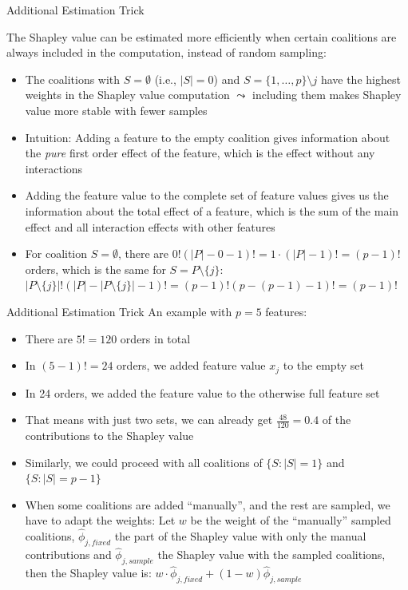 \documentclass[11pt,compress,t,notes=noshow, aspectratio=169, xcolor=table]{beamer}
\begin{document}
\begin{frame}{Additional Estimation Trick}


  The Shapley value can be estimated more efficiently when certain coalitions are always included in the computation, instead of random sampling:
  \vspace{0.25cm}
  \begin{itemize}
  \itemsep1em
    \item The coalitions with $S = \emptyset$ (i.e., $|S| = 0$) and $S = \{1, \ldots, p\} \setminus j$ have the highest weights in the Shapley value computation $\leadsto$ including them makes Shapley value more stable with fewer samples %
    \item Intuition: Adding a feature to the empty coalition gives information about the \textit{pure} first order effect of the feature, which is the effect without any interactions 
    \item Adding the feature value to the complete set of feature values gives us the information about the total effect of a feature, which is the sum of the main effect and all interaction effects with other features
    \item For coalition $S = \emptyset$, there are $0! (|P| - 0 - 1)! = 1 \cdot (|P| - 1)! = (p - 1)!$ orders, which is the same for $S = P \setminus \{j\}$: $|P \setminus \{j\}|! (|P| - |P \setminus \{j\}| - 1)! = (p - 1)! (p - (p-1) - 1)! = (p-1)!$
\end{itemize}
 \end{frame}

\begin{frame}{Additional Estimation Trick}
An example with $p = 5$ features:
\vspace{0.25cm}
    \begin{itemize}
    \itemsep1em
        \item There are $5! = 120$ orders in total
        \item In $(5 - 1)! = 24$ orders, we added feature value $x_j$ to the empty set
        \item In 24 orders, we added the feature value to the otherwise full feature set
        \item That means with just two sets, we can already get $\frac{48}{120} = 0.4$ of the contributions to the Shapley value
        \item Similarly, we could proceed with all coalitions of $\{S: |S| = 1\}$ and $\{S: |S| = p - 1\}$
        \item When some coalitions are added \enquote{manually}, and the rest are sampled, we have to adapt the weights: Let $w$ be the weight of the \enquote{manually} sampled coalitions, $\hat{\phi}_{j,fixed}$ the part of the Shapley value with only the manual contributions and $\hat{\phi}_{j,sample}$ the Shapley value with the sampled coalitions, then the Shapley value is: $w \cdot \hat{\phi}_{j,fixed} + (1 - w) \hat{\phi}_{j,sample}$
  \end{itemize}
\end{frame}
\end{document}
